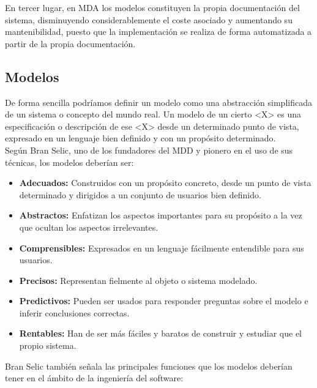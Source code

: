 En tercer lugar, en MDA los modelos constituyen la propia documentación del sistema, disminuyendo considerablemente el coste asociado y aumentando su mantenibilidad, puesto que la implementación se realiza de forma automatizada a partir de la propia documentación.

\subsection{Modelos}
\label{Modelos}

De forma sencilla podríamos definir un modelo como una abstracción simplificada de un sistema o concepto del mundo real. Un modelo de un cierto <X>  es una especificación o descripción de ese <X> desde un determinado punto de vista, expresado en un lenguaje bien definido y con un propósito determinado.\\

Según Bran Selic, uno de los fundadores del MDD y pionero en el uso de sus técnicas, los modelos deberían ser:
\begin{itemize}
	\item \textbf{Adecuados:} Construidos con un propósito concreto, desde un punto de vista determinado y dirigidos a un conjunto de usuarios bien definido.
	
	\item \textbf{Abstractos:} Enfatizan los aspectos importantes para su propósito a la vez que ocultan los aspectos irrelevantes.
	
	\item \textbf{Comprensibles:} Expresados en un lenguaje fácilmente entendible para sus usuarios.
	
	\item \textbf{Precisos:} Representan fielmente al objeto o sistema modelado.
	
	\item \textbf{Predictivos:} Pueden ser usados para responder preguntas sobre el modelo e inferir conclusiones correctas.
	
	\item \textbf{Rentables:} Han de ser más fáciles y baratos de construir y estudiar que el propio sistema.
\end{itemize}

Bran Selic también señala las principales funciones que los modelos deberían tener en el ámbito de la ingeniería del software:

